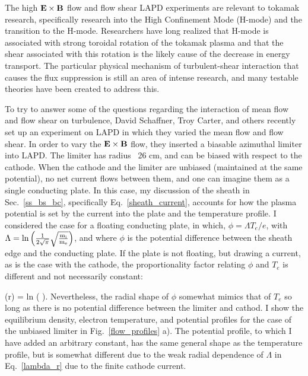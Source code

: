 The high ${\bf E \times B}$ flow and flow shear LAPD experiments are relevant to tokamak research, specifically research into the High Confinement Mode (H-mode)
and the transition to the H-mode. Researchers have long realized that H-mode is associated with strong toroidal rotation of the tokamak plasma and that the shear associated with this rotation
is the likely cause of the decrease in energy transport. The particular physical mechanism of turbulent-shear interaction that causes the flux suppression is still an area of intense
research, and many testable theories have been created to address this.

To try to answer some of the questions regarding the interaction of mean flow and flow shear on turbulence, David Schaffner, Troy Carter, and others recently set up an experiment on LAPD
in which they varied the mean flow and flow shear. In order to vary the ${\bf E \times B}$ flow, they inserted a biasable azimuthal limiter into LAPD. The limiter has radius ~26 cm, and
can be biased with respect to the cathode. When the cathode and the limiter are unbiased (maintained at the same potential), no net current flows between them, and one can imagine them
as a single conducting plate. In this case, my discussion of the sheath in Sec.~\ref{ss_bs_bc}, specifically Eq.~\ref{sheath_current}, accounts for how the plasma potential is set by
the current into the plate and the temperature profile. I considered the case for a floating conducting plate, in which, $\phi = \Lambda T_e /e$, with 
$\Lambda = \rm{ln} \left( \frac{1}{2 \sqrt{\pi}} \sqrt{\frac{m_i}{m_e}}  \right)$, and where $\phi$ is the potential difference between the sheath edge and the conducting plate. If the plate is not
floating, but drawing a current, as is the case with the cathode, the proportionality factor relating $\phi$ and $T_e$ is different and not necessarily constant:

\beq
\label{lambda_r}
\Lambda(r) = \rm{ln} \left(  \sqrt{\fmie}  \right).
\eeq
Nevertheless, the radial shape of $\phi$ somewhat mimics that of $T_e$ so long as there is no potential difference between the limiter and cathod. 
I show the equilibrium density, electron temperature, and potential profiles
for the case of the unbiased limiter in Fig.~\ref{flow_profiles} a). The potential profile, to which I have added an arbitrary constant, has the same general shape as the temperature profile,
but is somewhat different due to the weak radial dependence of $\Lambda$ in Eq.~\ref{lambda_r} due to the finite cathode current.

